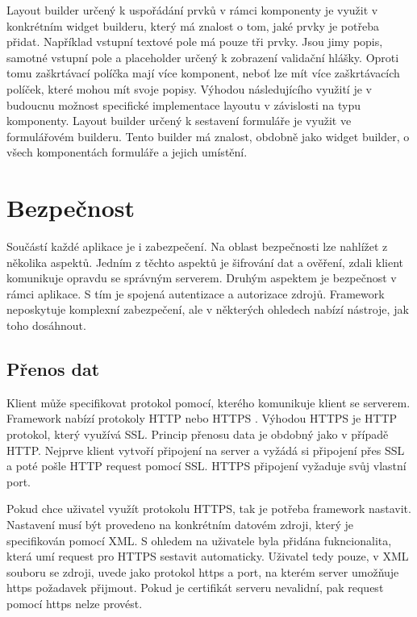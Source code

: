 Layout builder určený k uspořádání prvků v rámci komponenty je využit v konkrétním widget builderu, který má znalost o tom, jaké prvky je potřeba přidat. Například vstupní textové pole má pouze tři prvky. Jsou jimy popis, samotné vstupní pole a placeholder určený k zobrazení validační hlášky. Oproti tomu zaškrtávací políčka mají více komponent, neboť lze mít více zaškrtávacích políček, které mohou mít svoje popisy. Výhodou následujícího využití je v budoucnu možnost specifické implementace layoutu v závislosti na typu komponenty. Layout builder určený k sestavení formuláře je využit ve formulářovém builderu. Tento builder má znalost, obdobně jako widget builder, o všech komponentách formuláře a jejich umístění.  

\section{Bezpečnost}
Součástí každé aplikace je i zabezpečení. Na oblast bezpečnosti lze nahlížet z několika aspektů. Jedním z těchto aspektů je šifrování dat a ověření, zdali klient komunikuje opravdu se správným serverem. Druhým aspektem je bezpečnost v rámci aplikace. S tím je spojená autentizace a autorizace zdrojů. Framework neposkytuje komplexní zabezpečení, ale v některých ohledech nabízí nástroje, jak toho dosáhnout.

\subsection{Přenos dat}
Klient může specifikovat protokol pomocí, kterého komunikuje klient se serverem. Framework nabízí protokoly HTTP nebo HTTPS \cite{https}. Výhodou HTTPS je HTTP protokol, který využívá SSL. Princip přenosu data je obdobný jako v případě HTTP. Nejprve klient vytvoří připojení na server a vyžádá si připojení přes SSL a poté pošle HTTP request pomocí SSL. HTTPS připojení vyžaduje svůj vlastní port. 

Pokud chce uživatel využít protokolu HTTPS, tak je potřeba framework nastavit. Nastavení musí být provedeno na konkrétním datovém zdroji, který je specifikován pomocí XML. S ohledem na uživatele byla přidána fukncionalita, která umí request pro HTTPS sestavit automaticky. Uživatel tedy pouze, v XML souboru se zdroji, uvede jako protokol https a port, na kterém server umožňuje https požadavek přijmout. Pokud je certifikát serveru nevalidní, pak request pomocí https nelze provést.

